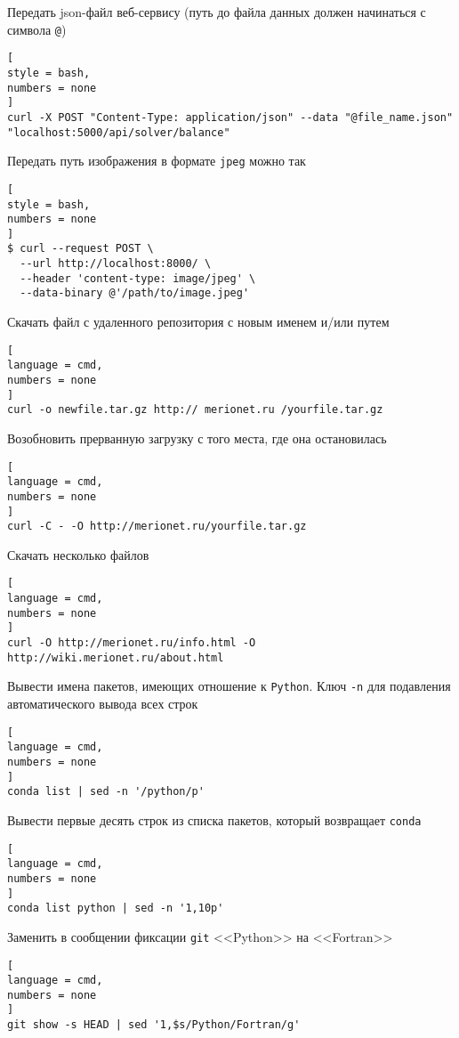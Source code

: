 \documentclass[%
	11pt,
	a4paper,
	utf8,
		]{article}
\begin{document}
Передать json-файл веб-сервису (путь до файла данных должен начинаться с символа \verb|@|)
\begin{lstlisting}[
style = bash,
numbers = none
]
curl -X POST "Content-Type: application/json" --data "@file_name.json" "localhost:5000/api/solver/balance"
\end{lstlisting}

Передать путь изображения в формате \verb|jpeg| можно так
\begin{lstlisting}[
style = bash,
numbers = none
]
$ curl --request POST \
  --url http://localhost:8000/ \
  --header 'content-type: image/jpeg' \
  --data-binary @'/path/to/image.jpeg'
\end{lstlisting}

Скачать файл с удаленного репозитория с новым именем и/или путем
\begin{lstlisting}[
language = cmd,
numbers = none
]
curl -o newfile.tar.gz http:// merionet.ru /yourfile.tar.gz
\end{lstlisting}

Возобновить прерванную загрузку с того места, где она остановилась
\begin{lstlisting}[
language = cmd,
numbers = none
]
curl -C - -O http://merionet.ru/yourfile.tar.gz
\end{lstlisting}

Скачать несколько файлов 
\begin{lstlisting}[
language = cmd,
numbers = none
]
curl -O http://merionet.ru/info.html -O http://wiki.merionet.ru/about.html
\end{lstlisting}

Вывести имена пакетов, имеющих отношение к \texttt{Python}. Ключ \verb|-n| для подавления автоматического вывода всех строк
\begin{lstlisting}[
language = cmd,
numbers = none
]
conda list | sed -n '/python/p' 
\end{lstlisting}

Вывести первые десять строк из списка пакетов, который возвращает \texttt{conda}
\begin{lstlisting}[
language = cmd,
numbers = none
]
conda list python | sed -n '1,10p'
\end{lstlisting}

Заменить в сообщении фиксации \texttt{git} <<Python>> на <<Fortran>>
\begin{lstlisting}[
language = cmd,
numbers = none
]
git show -s HEAD | sed '1,$s/Python/Fortran/g'
\end{lstlisting}
\end{document}

